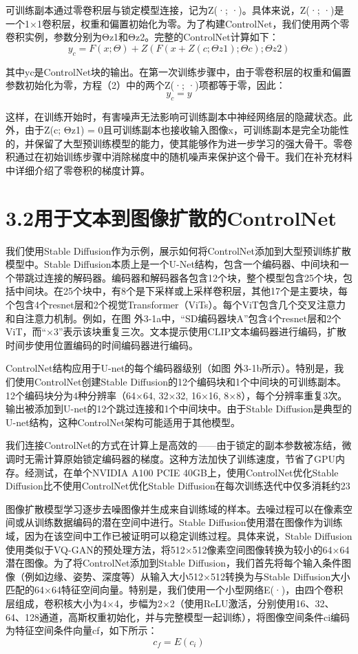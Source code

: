 \documentclass[a4paper,AutoFakeBold,oneside,12pt]{book}
\begin{document}
\begin{nopagenumber}
可训练副本通过零卷积层与锁定模型连接，记为Z(·; ·)。具体来说，Z(·; ·)是一个1×1卷积层，权重和偏置初始化为零。为了构建ControlNet，我们使用两个零卷积实例，参数分别为Θz1和Θz2。完整的ControlNet计算如下：
\[ y_{c} = F(x; \Theta) + Z(F(x + Z(c; \Theta{z1}); \Theta{c}); \Theta{z2}) \]

其中yc是ControlNet块的输出。在第一次训练步骤中，由于零卷积层的权重和偏置参数初始化为零，方程（2）中的两个Z(·; ·)项都等于零，因此：
\[ y_{c} = y \]

这样，在训练开始时，有害噪声无法影响可训练副本中神经网络层的隐藏状态。此外，由于Z(c; Θz1) = 0且可训练副本也接收输入图像x，可训练副本是完全功能性的，并保留了大型预训练模型的能力，使其能够作为进一步学习的强大骨干。零卷积通过在初始训练步骤中消除梯度中的随机噪声来保护这个骨干。我们在补充材料中详细介绍了零卷积的梯度计算。

\section*{3.2\quad{}用于文本到图像扩散的ControlNet}
我们使用Stable Diffusion作为示例，展示如何将ControlNet添加到大型预训练扩散模型中。Stable Diffusion本质上是一个U-Net结构，包含一个编码器、中间块和一个带跳过连接的解码器。编码器和解码器各包含12个块，整个模型包含25个块，包括中间块。在25个块中，有8个是下采样或上采样卷积层，其他17个是主要块，每个包含4个resnet层和2个视觉Transformer（ViTs）。每个ViT包含几个交叉注意力和自注意力机制。例如，在图 外3-1a中，“SD编码器块A”包含4个resnet层和2个ViT，而“×3”表示该块重复三次。文本提示使用CLIP文本编码器进行编码，扩散时间步使用位置编码的时间编码器进行编码。

ControlNet结构应用于U-net的每个编码器级别（如图 外3-1b所示）。特别是，我们使用ControlNet创建Stable Diffusion的12个编码块和1个中间块的可训练副本。12个编码块分为4种分辨率（64×64, 32×32, 16×16, 8×8），每个分辨率重复3次。输出被添加到U-net的12个跳过连接和1个中间块中。由于Stable Diffusion是典型的U-net结构，这种ControlNet架构可能适用于其他模型。

我们连接ControlNet的方式在计算上是高效的——由于锁定的副本参数被冻结，微调时无需计算原始锁定编码器的梯度。这种方法加快了训练速度，节省了GPU内存。经测试，在单个NVIDIA A100 PCIE 40GB上，使用ControlNet优化Stable Diffusion比不使用ControlNet优化Stable Diffusion在每次训练迭代中仅多消耗约23%

图像扩散模型学习逐步去噪图像并生成来自训练域的样本。去噪过程可以在像素空间或从训练数据编码的潜在空间中进行。Stable Diffusion使用潜在图像作为训练域，因为在该空间中工作已被证明可以稳定训练过程。具体来说，Stable Diffusion使用类似于VQ-GAN的预处理方法，将512×512像素空间图像转换为较小的64×64潜在图像。为了将ControlNet添加到Stable Diffusion，我们首先将每个输入条件图像（例如边缘、姿势、深度等）从输入大小512×512转换为与Stable Diffusion大小匹配的64×64特征空间向量。特别是，我们使用一个小型网络E(·)，由四个卷积层组成，卷积核大小为4×4，步幅为2×2（使用ReLU激活，分别使用16、32、64、128通道，高斯权重初始化，并与完整模型一起训练），将图像空间条件ci编码为特征空间条件向量cf，如下所示：
\[ c_{f} = E(c_{i}) \]


\end{nopagenumber}
\end{document}
